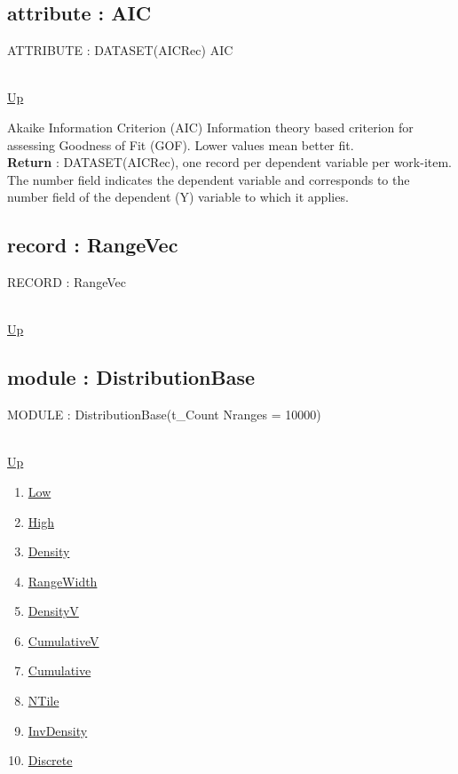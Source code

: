 \subsection*{attribute : AIC}
\hypertarget{ecldoc:linearregression.ols.aic}{ATTRIBUTE : DATASET(AICRec) AIC} \\
\hyperlink{ecldoc:linearregression.ols}{Up} \\
\par
Akaike Information Criterion (AIC) Information theory based criterion for assessing Goodness of Fit (GOF). Lower values mean better fit. \\
\textbf{Return} : DATASET(AICRec), one record per dependent variable per work-item. The number field indicates the dependent variable and corresponds to the number field of the dependent (Y) variable to which it applies. \\
\subsection*{record : RangeVec}
\hypertarget{ecldoc:linearregression.ols.rangevec}{RECORD : RangeVec} \\
\hyperlink{ecldoc:linearregression.ols}{Up} \\
\par
\subsection*{module : DistributionBase}
\hypertarget{ecldoc:linearregression.ols.distributionbase}{MODULE : DistributionBase(t\_Count Nranges = 10000)} \\
\hyperlink{ecldoc:linearregression.ols}{Up} \\
\par
\begin{enumerate}
\item \hyperlink{ecldoc:linearregression.ols.distributionbase.low}{Low}
\item \hyperlink{ecldoc:linearregression.ols.distributionbase.high}{High}
\item \hyperlink{ecldoc:linearregression.ols.distributionbase.density}{Density}
\item \hyperlink{ecldoc:linearregression.ols.distributionbase.rangewidth}{RangeWidth}
\item \hyperlink{ecldoc:linearregression.ols.distributionbase.densityv}{DensityV}
\item \hyperlink{ecldoc:linearregression.ols.distributionbase.cumulativev}{CumulativeV}
\item \hyperlink{ecldoc:linearregression.ols.distributionbase.cumulative}{Cumulative}
\item \hyperlink{ecldoc:linearregression.ols.distributionbase.ntile}{NTile}
\item \hyperlink{ecldoc:linearregression.ols.distributionbase.invdensity}{InvDensity}
\item \hyperlink{ecldoc:linearregression.ols.distributionbase.discrete}{Discrete}
\end{enumerate}

